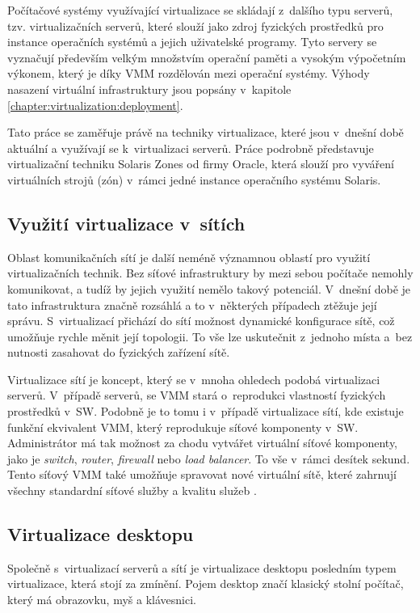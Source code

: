 Počítačové systémy využívající virtualizace se skládají z~dalšího typu serverů, tzv. virtualizačních serverů, které slouží
jako zdroj fyzických prostředků pro instance operačních systémů a jejich uživatelské programy. Tyto servery se vyznačují 
především velkým množstvím operační paměti a vysokým výpočetním výkonem, který je díky VMM rozdělován mezi operační systémy.
Výhody nasazení virtuální infrastruktury jsou popsány v~kapitole \ref{chapter:virtualization:deployment}.

Tato práce se zaměřuje právě na techniky virtualizace, které jsou v~dnešní době aktuální a využívají se k~virtualizaci serverů.
Práce podrobně představuje virtualizační techniku Solaris Zones od firmy Oracle, která slouží pro vyváření virtuálních strojů
(zón) v~rámci jedné instance operačního systému Solaris.
\subsection{Využití virtualizace v~sítích}
\label{chapter:virtualization:it:networks}
Oblast komunikačních sítí je další neméně významnou oblastí pro využití virtualizačních technik. Bez síťové infrastruktury by
mezi sebou počítače nemohly komunikovat, a tudíž by jejich využití nemělo takový potenciál. V~dnešní době je tato infrastruktura
značně rozsáhlá a to v~některých případech ztěžuje její správu. S~virtualizací přichází do sítí možnost dynamické konfigurace
sítě, což umožňuje rychle měnit její topologii. To vše lze uskutečnit z~jednoho místa a~bez nutnosti zasahovat do fyzických
zařízení sítě.

Virtualizace sítí je koncept, který se v~mnoha ohledech podobá virtualizaci serverů. V~případě serverů, se VMM stará o~reprodukci
vlastností fyzických prostředků v~SW. Podobně je to tomu i v~případě virtualizace sítí, kde existuje funkční ekvivalent VMM, který
reprodukuje síťové komponenty v~SW. Administrátor má tak možnost za chodu vytvářet virtuální síťové komponenty, jako je 
\textit{switch}, \textit{router}, \textit{firewall} nebo \textit{load balancer}. To vše v~rámci desítek sekund. Tento síťový
VMM také umožňuje spravovat nové virtuální sítě, které zahrnují všechny standardní síťové služby a kvalitu služeb 
\cite{article:vmware:network_virtualization}.
\subsection{Virtualizace desktopu}
\label{chapter:virtualization:it:desktop}
Společně s~virtualizací serverů a sítí je virtualizace desktopu posledním typem virtualizace, která stojí za zmínění. Pojem
desktop značí klasický stolní počítač, který má obrazovku, myš a klávesnici.

